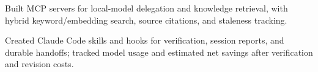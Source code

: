 \begin{bullets}
  \item Built MCP servers for local-model delegation and knowledge retrieval, with hybrid keyword/embedding search, source citations, and staleness tracking.
  \item Created Claude Code skills and hooks for verification, session reports, and durable handoffs; tracked model usage and estimated net savings after verification and revision costs.
\end{bullets}
